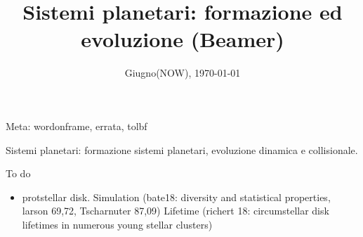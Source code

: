 \documentclass[10pt,xcolor={usenames},fleqn,mathserif,serif]{beamer}
\title{Sistemi planetari: formazione ed evoluzione (Beamer)}
\subtitle{}
\date{Giugno(NOW), \today}
\begin{document}



\begin{frame}
  \titlepage
  Meta: wordonframe, errata, tolbf
\end{frame}


\begin{frame}[allowframebreaks]{Sistemi planetari: formazione sistemi planetari, evoluzione dinamica e collisionale.}
\tableofcontents[onlyparts]
\end{frame}

\begin{wordonframe}{To do}
\begin{itemize}
\item protstellar disk.
Simulation (bate18: diversity and statistical properties, larson 69,72, Tscharnuter 87,09)
Lifetime (richert 18: circumstellar disk lifetimes in numerous young stellar clusters)

\end{itemize}
\end{wordonframe}
\end{document}
